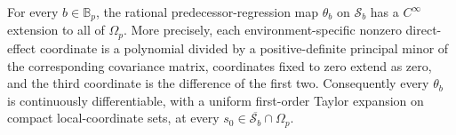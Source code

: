 For every \(b\in\mathbb B_p\), the rational predecessor-regression map \(\theta_b\) on \(\mathcal S_b\) has a \(C^\infty\) extension to all of \(\Omega_p\). More precisely, each environment-specific nonzero direct-effect coordinate is a polynomial divided by a positive-definite principal minor of the corresponding covariance matrix, coordinates fixed to zero extend as zero, and the third coordinate is the difference of the first two. Consequently every \(\theta_b\) is continuously differentiable, with a uniform first-order Taylor expansion on compact local-coordinate sets, at every \(s_0\in\overline{\mathcal S_b}\cap\Omega_p\).